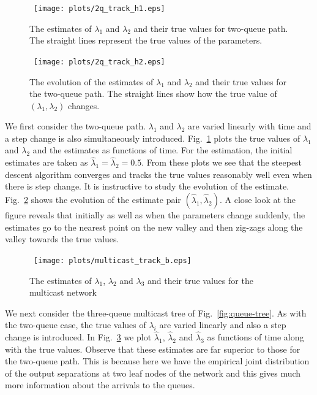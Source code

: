 \documentclass[11pt]{article}
\begin{document}
\begin{figure}
  \begin{center}
    \ \texttt{[image: plots/2q\_track\_h1.eps]}
  \end{center}
  \caption{The estimates of $\lambda_1$ and $\lambda_2$ and their true
    values for two-queue path. The straight lines represent the true
    values of the parameters.}
  \label{fig2q_a}
\end{figure}
\begin{figure}
  \begin{center}
    \ \texttt{[image: plots/2q\_track\_h2.eps]}
  \end{center}
  \caption{The evolution of the estimates of $\lambda_1$ and
    $\lambda_2$ and their true values for the two-queue path. The
    straight lines show how the true value of $(\lambda_1, \lambda_2)$
    changes.  }
  \label{fig2q_b}
\end{figure}
We first consider the two-queue path. $\lambda_1$ and $\lambda_2$ are
varied linearly with time and a step change is also simultaneously
introduced. Fig.~\ref{fig2q_a} plots the true values of $\lambda_1$
and $\lambda_2$ and the estimates as functions of time.  For the
estimation, the initial estimates are taken as $\hat{\lambda}_1 =
\hat{\lambda}_2=0.5.$ From these plots we see that the steepest
descent algorithm converges and tracks the true values reasonably well
even when there is step change. It is instructive to study the
evolution of the estimate. Fig.~\ref{fig2q_b} shows the evolution of
the estimate pair $(\hat{\lambda}_1, \hat{\lambda}_2).$ A close look
at the figure reveals that initially as well as when the parameters
change suddenly, the estimates go to the nearest point on the new
valley and then zig-zags along the valley towards the true values.


\begin{figure}
  \begin{center}
    \
    \texttt{[image: plots/multicast\_track\_b.eps]}
  \end{center}
  \caption{The estimates of $\lambda_1$, $\lambda_2$ and $\lambda_3$
    and their true values for the multicast network}
  \label{fig_mult}
\end{figure}


We next consider the three-queue multicast tree of
Fig.~\ref{fig:queue-tree}. As with the two-queue case, the true values
of $\lambda_i$ are varied linearly and also a step change is
introduced. In Fig.~\ref{fig_mult} we plot $\hat{\lambda}_1$,
$\hat{\lambda}_2$ and $\hat{\lambda}_3$ as functions of time along
with the true values. Observe that these estimates are far superior to
those for the two-queue path. This is because here we have the
empirical joint distribution of the output separations at two leaf
nodes of the network and this gives much more information about the
arrivals to the queues.
\end{document}
